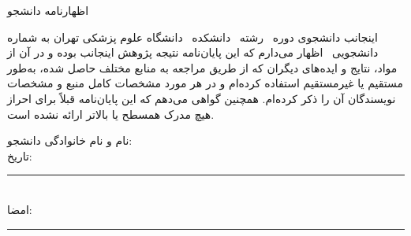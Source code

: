 \ChapterStart
\thispagestyle{empty}
\begin{center}
  {\XTitr\large اظهارنامه دانشجو}
\end{center}
\vspace{1.5em}

\noindent
اینجانب \textbf{\StudentNameFA} دانشجوی دوره \StudentDegreeFA\ رشته \StudentFieldFA\
دانشکده \FacultyFA\ دانشگاه علوم پزشکی تهران به شماره دانشجویی \StudentID\
اظهار می‌دارم که این پایان‌نامه نتیجه پژوهش اینجانب بوده و در آن از مواد،
نتایج و ایده‌های دیگران که از طریق مراجعه به منابع مختلف حاصل شده، به‌طور
مستقیم یا غیرمستقیم استفاده کرده‌ام و در هر مورد مشخصات کامل منبع و مشخصات
نویسندگان آن را ذکر کرده‌ام. همچنین گواهی می‌دهم که این پایان‌نامه قبلاً برای
احراز هیچ مدرک همسطح یا بالاتر ارائه نشده است.

\vspace{2em}
\begin{flushleft}
  نام و نام خانوادگی دانشجو: \StudentNameFA\\[1em]
  تاریخ: \rule{5cm}{0.4pt}\\[1em]
  امضا: \rule{5cm}{0.4pt}
\end{flushleft}
\clearpage

